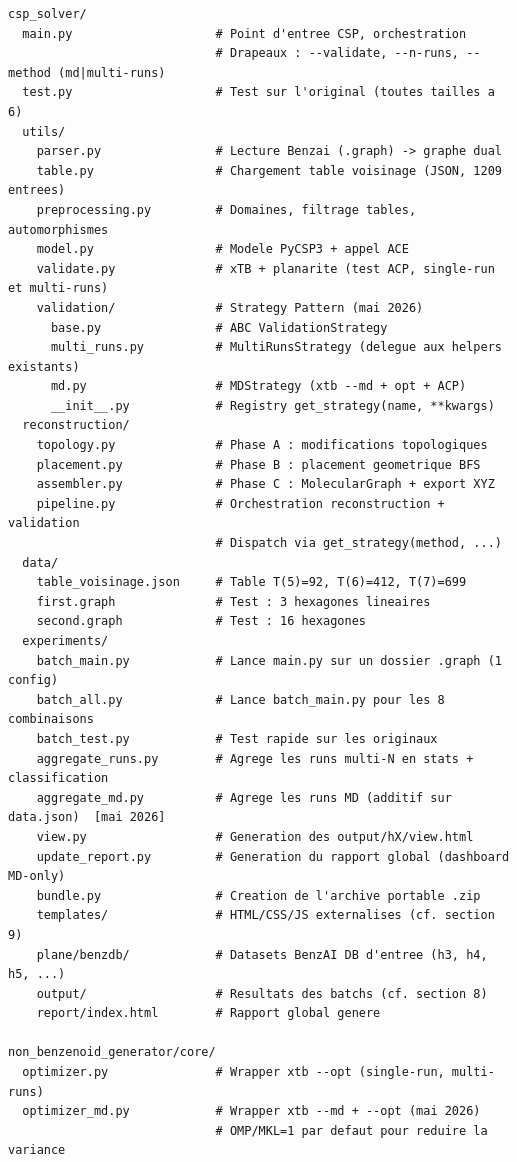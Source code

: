 \documentclass[12pt,a4paper]{article}
\theoremstyle{definition}
\begin{document}
\begin{lstlisting}[style=benzai]
csp_solver/
  main.py                    # Point d'entree CSP, orchestration
                             # Drapeaux : --validate, --n-runs, --method (md|multi-runs)
  test.py                    # Test sur l'original (toutes tailles a 6)
  utils/
    parser.py                # Lecture Benzai (.graph) -> graphe dual
    table.py                 # Chargement table voisinage (JSON, 1209 entrees)
    preprocessing.py         # Domaines, filtrage tables, automorphismes
    model.py                 # Modele PyCSP3 + appel ACE
    validate.py              # xTB + planarite (test ACP, single-run et multi-runs)
    validation/              # Strategy Pattern (mai 2026)
      base.py                # ABC ValidationStrategy
      multi_runs.py          # MultiRunsStrategy (delegue aux helpers existants)
      md.py                  # MDStrategy (xtb --md + opt + ACP)
      __init__.py            # Registry get_strategy(name, **kwargs)
  reconstruction/
    topology.py              # Phase A : modifications topologiques
    placement.py             # Phase B : placement geometrique BFS
    assembler.py             # Phase C : MolecularGraph + export XYZ
    pipeline.py              # Orchestration reconstruction + validation
                             # Dispatch via get_strategy(method, ...)
  data/
    table_voisinage.json     # Table T(5)=92, T(6)=412, T(7)=699
    first.graph              # Test : 3 hexagones lineaires
    second.graph             # Test : 16 hexagones
  experiments/
    batch_main.py            # Lance main.py sur un dossier .graph (1 config)
    batch_all.py             # Lance batch_main.py pour les 8 combinaisons
    batch_test.py            # Test rapide sur les originaux
    aggregate_runs.py        # Agrege les runs multi-N en stats + classification
    aggregate_md.py          # Agrege les runs MD (additif sur data.json)  [mai 2026]
    view.py                  # Generation des output/hX/view.html
    update_report.py         # Generation du rapport global (dashboard MD-only)
    bundle.py                # Creation de l'archive portable .zip
    templates/               # HTML/CSS/JS externalises (cf. section 9)
    plane/benzdb/            # Datasets BenzAI DB d'entree (h3, h4, h5, ...)
    output/                  # Resultats des batchs (cf. section 8)
    report/index.html        # Rapport global genere

non_benzenoid_generator/core/
  optimizer.py               # Wrapper xtb --opt (single-run, multi-runs)
  optimizer_md.py            # Wrapper xtb --md + --opt (mai 2026)
                             # OMP/MKL=1 par defaut pour reduire la variance
\end{lstlisting}
\end{document}
